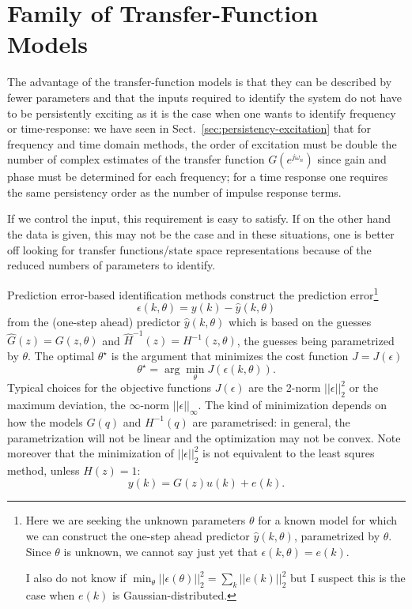 \section{Family of Transfer-Function Models}
\label{sec:family-tf-models}

The advantage of the transfer-function models is that they can be described by fewer parameters and that the inputs required to identify the system do not have to be persistently exciting as it is the case when one wants to identify frequency or time-response: we have seen in Sect.~\ref{sec:persistency-excitation} that for frequency and time domain methods, the order of excitation must be double the number of complex estimates of the transfer function $G(e^{j\omega_n})$ since gain and phase must be determined for each frequency; for a time response one requires the same persistency order as the number of impulse response terms.

If we control the input, this requirement is easy to satisfy. If on the other hand the data is given, this may not be the case and in these situations, one is better off looking for transfer functions/state space representations because of the reduced numbers of parameters to identify.

Prediction error-based identification methods construct the prediction error\footnote{Here we are seeking the unknown parameters $\theta$ for a known model for which we can construct the one-step ahead predictor $\hat{y}(k,\theta)$, parametrized by $\theta$. Since $\theta$ is unknown, we cannot say just yet that $\epsilon(k,\theta) = e(k)$.

  I also do not know if $\min_\theta ||\epsilon(\theta)||_2^2 = \sum_k ||e(k)||_2^2$ but I suspect this is the case when $e(k)$ is Gaussian-distributed.}
\begin{equation}
  \label{eq:prediction-error-parametrized}
  \epsilon(k,\theta) = y(k) - \hat{y}(k,\theta)
\end{equation}
from the (one-step ahead) predictor $\hat{y}(k,\theta)$ which is based on the guesses $\hat{G}(z)=G(z,\theta)$ and $\hat{H}^{-1}(z)=H^{-1}(z,\theta)$, the guesses being parametrized by $\theta$. The optimal $\theta^\star$ is the argument that minimizes the cost function $J=J(\epsilon)$
\begin{equation*}
  \theta^\star = \arg \min_\theta J(\epsilon(k,\theta)).
\end{equation*}
Typical choices for the objective functions $J(\epsilon)$ are the 2-norm $||\epsilon||_2^2$ or the maximum deviation, the $\infty$-norm $||\epsilon||_\infty$. The kind of minimization depends on how the models $G(q)$ and $H^{-1}(q)$ are parametrised: in general, the parametrization will not be linear and the optimization may not be convex. Note moreover that the minimization of $||\epsilon||_2^2$ is not equivalent to the least squres method, unless  $H(z)=1$:
\begin{equation*}
  y(k) = G(z)u(k) + e(k).
\end{equation*}

